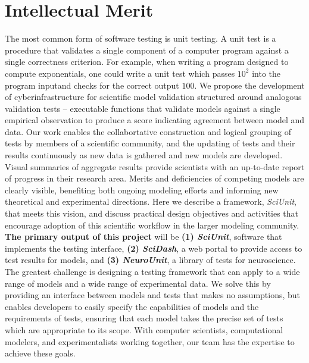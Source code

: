 \documentclass[11pt,letterpaper]{article}
\begin{document}
\section{Intellectual Merit}
The most common form of software testing is unit testing. 
A unit test is a procedure that validates a single component of a computer program against a single correctness criterion. 
For example, when writing a program designed to compute exponentials, one could write a unit test which passes $10^2$ into the program inputand checks for the correct output $100$.   
We propose the development of cyberinfrastructure for scientific model validation structured around analogous validation tests -- 
executable functions that validate models against a single empirical observation to produce a score indicating agreement between model and data. 
Our work enables the collabortative construction and logical grouping of tests by members of a scientific community, and the updating of tests and their results continuously as new data is gathered and new models are developed. 
Visual summaries of aggregate results provide scientists with an up-to-date report of progress in their research area. 
Merits and deficiencies of competing models are clearly visible, benefiting both ongoing modeling efforts and informing new theoretical and experimental directions. 
Here we describe a framework, \textit{SciUnit}, that meets this vision, and discuss practical design objectives and activities that encourage adoption of this scientific workflow in the larger modeling community. 
\textbf{The primary output of this project} will be \textbf{(1) \textit{SciUnit}}, software that implements the testing interface, \textbf{(2) \textit{SciDash}}, a web portal to provide access to test results for models, and \textbf{(3) \textit{NeuroUnit}}, a library of tests for neuroscience.  
The greatest challenge is designing a testing framework that can apply to a wide range of models and a wide range of experimental data.  
We solve this by providing an interface between models and tests that makes no assumptions, but enables developers to easily specify the capabilities of models and the requirements of tests, ensuring that each model takes the precise set of tests which are appropriate to its scope.  
With computer scientists, computational modelers, and experimentalists working together, our team has the expertise to achieve these goals. 
\end{document}
